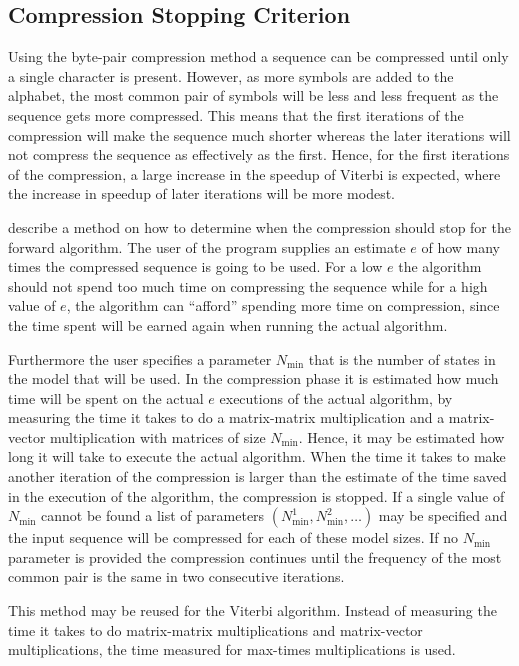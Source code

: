 \subsection{Compression Stopping Criterion}
\label{sec:compr-stopp-crit}

Using the byte-pair compression method a sequence can be compressed until only
a single character is present. However, as more symbols are added to the
alphabet, the most common pair of symbols will be less and less frequent as the
sequence gets more compressed. This means that the first iterations of the
compression will make the sequence much shorter whereas the later iterations
will not compress the sequence as effectively as the first. Hence, for the
first iterations of the compression, a large increase in the speedup of Viterbi
is expected, where the increase in speedup of later iterations will be more
modest.

\citet{sand2013ziphmmlib} describe a method on how to determine when the
compression should stop for the forward algorithm. The user of the program
supplies an estimate $e$ of how many times the compressed sequence is going to
be used. For a low $e$ the algorithm should not spend too much time on
compressing the sequence while for a high value of $e$, the algorithm can
``afford'' spending more time on compression, since the time spent will be
earned again when running the actual algorithm.

Furthermore the user specifies a parameter $N_{\text{min}}$ that is the number
of states in the model that will be used. In the compression phase it is
estimated how much time will be spent on the actual $e$ executions of the
actual algorithm, by measuring the time it takes to do a matrix-matrix
multiplication and a matrix-vector multiplication with matrices of size
$N_{\text{min}}$. Hence, it may be estimated how long it will take to execute
the actual algorithm. When the time it takes to make another iteration of the
compression is larger than the estimate of the time saved in the execution of
the algorithm, the compression is stopped. If a single value of
$N_{\text{min}}$ cannot be found a list of parameters
$(N_{\text{min}}^1, N_{\text{min}}^2, \dots)$ may be specified and the input
sequence will be compressed for each of these model sizes. If no
$N_{\text{min}}$ parameter is provided the compression continues until the
frequency of the most common pair is the same in two consecutive iterations.

This method may be reused for the Viterbi algorithm. Instead of measuring the
time it takes to do matrix-matrix multiplications and matrix-vector
multiplications, the time measured for max-times multiplications is used.


